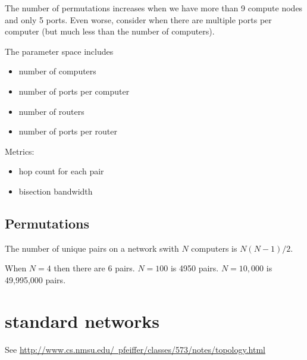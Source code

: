 \documentclass[pdftex]{article}
\begin{document}
The number of permutations increases when we have more than 9 compute nodes and only 5 ports. Even worse, consider when there are multiple ports per computer (but much less than the number of computers).

The parameter space includes
\begin{itemize}
 \item number of computers
 \item number of ports per computer
 \item number of routers
 \item number of ports per router
\end{itemize}
Metrics:
\begin{itemize}
 \item hop count for each pair
 \item bisection bandwidth
\end{itemize}


\subsection{Permutations}

The number of unique pairs on a network swith $N$ computers is $N(N-1)/2$. 

When $N=4$ then there are 6 pairs. $N=100$ is 4950 pairs. $N=10,000$ is 49,995,000 pairs.

\section{standard networks}

See \href{http://www.cs.nmsu.edu/~pfeiffer/classes/573/notes/topology.html}{http://www.cs.nmsu.edu/~pfeiffer/classes/573/notes/topology.html}
\end{document}
